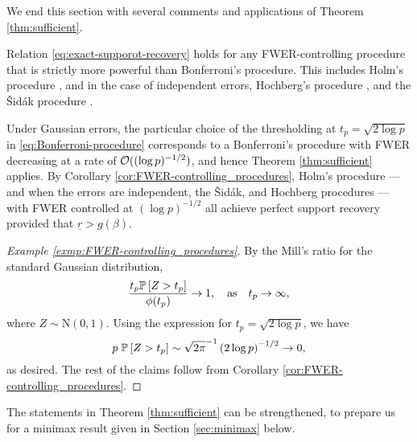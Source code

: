 \medskip
We end this section with several comments and applications of Theorem \ref{thm:sufficient}.
\begin{corollary}
\label{cor:FWER-controlling_procedures}  
Relation \eqref{eq:exact-supporot-recovery} holds for any FWER-controlling procedure that is strictly more powerful than Bonferroni's procedure. 
This includes Holm's procedure \citep*{holm1979simple}, and in the case of independent errors, Hochberg's procedure \citep*{hochberg1988sharper}, and the {\v{S}}id{\'a}k procedure \citep*{vsidak1967rectangular}.
\end{corollary}

\begin{example} \label{exmp:FWER-controlling_procedures}
Under Gaussian errors, the particular choice of the thresholding at $t_p = \sqrt{2\log{p}}$ in \eqref{eq:Bonferroni-procedure} corresponds to a Bonferroni's procedure with FWER decreasing at a rate of ${\cal O}((\log{p})^{-1/2})$, and hence Theorem \ref{thm:sufficient} applies. 
By Corollary \ref{cor:FWER-controlling_procedures}, Holm's procedure --- and when the errors are independent, the {\v{S}}id{\'a}k, and Hochberg procedures --- with FWER controlled at $(\log{p})^{-1/2}$ all achieve perfect support recovery provided that $\underline{r}>g(\beta)$.

\begin{proof}[Example \ref{exmp:FWER-controlling_procedures}]
By the Mill's ratio for the standard Gaussian distribution,
$$
\frac{t_p \P\left[Z>t_p\right]}{\phi(t_p)} \to 1,\quad \text{as}\quad t_p\to\infty,
$$
where $Z\sim \text{N}(0,1)$. 
Using the expression for $t_p = \sqrt{2\log{p}}$, we have
$$
p \;\P\left[Z>t_p\right] \sim \sqrt{2\pi}^{-1}\left(2\log{p}\right)^{-1/2} \to 0,
$$
as desired. The rest of the claims follow from Corollary \ref{cor:FWER-controlling_procedures}.
\end{proof}
\end{example}


The statements in Theorem \ref{thm:sufficient} can be strengthened, to prepare us for a minimax result given in Section \ref{sec:minimax} below.

